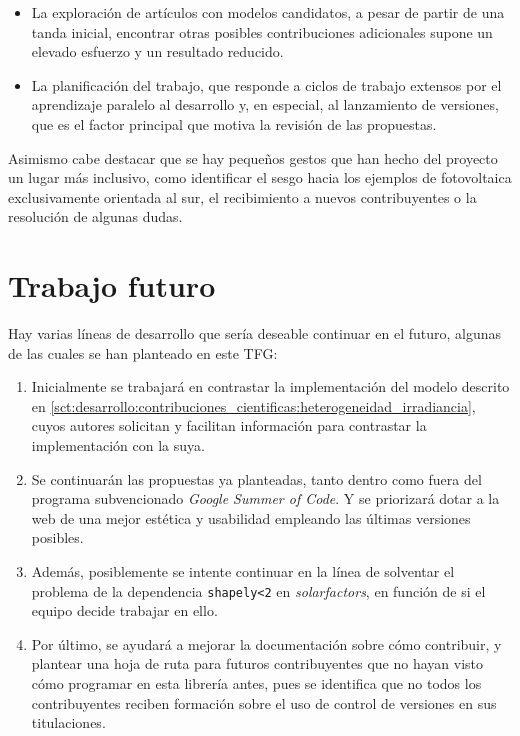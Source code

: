 \begin{itemize}
    \item La exploración de artículos con modelos candidatos, a pesar de partir de una tanda inicial, encontrar otras posibles contribuciones adicionales supone un elevado esfuerzo y un resultado reducido.
    \item La planificación del trabajo, que responde a ciclos de trabajo extensos por el aprendizaje paralelo al desarrollo y, en especial, al lanzamiento de versiones, que es el factor principal que motiva la revisión de las propuestas.
\end{itemize}

Asimismo cabe destacar que se hay pequeños gestos que han hecho del proyecto un lugar más inclusivo, como identificar el sesgo hacia los ejemplos de fotovoltaica exclusivamente orientada al sur, el recibimiento a nuevos contribuyentes o la resolución de algunas dudas.


\section{Trabajo futuro} \label{sct:resultados:trabajofuturo}

Hay varias líneas de desarrollo que sería deseable continuar en el futuro, algunas de las cuales se han planteado en este TFG:

\begin{enumerate}
    \item Inicialmente se trabajará en contrastar la implementación del modelo descrito en \ref{sct:desarrollo:contribuciones_cientificas:heterogeneidad_irradiancia}, cuyos autores solicitan y facilitan información para contrastar la implementación con la suya.
    \item Se continuarán las propuestas ya planteadas, tanto dentro como fuera del programa subvencionado \textit{Google Summer of Code}. Y se priorizará dotar a la web de una mejor estética y usabilidad empleando las últimas versiones posibles.
    \item Además, posiblemente se intente continuar en la línea de solventar el problema de la dependencia \texttt{shapely<2} en \textit{solarfactors}, en función de si el equipo decide trabajar en ello.
    \item Por último, se ayudará a mejorar la documentación sobre cómo contribuir, y plantear una hoja de ruta para futuros contribuyentes que no hayan visto cómo programar en esta librería antes, pues se identifica que no todos los contribuyentes reciben formación sobre el uso de control de versiones en sus titulaciones.
\end{enumerate}
